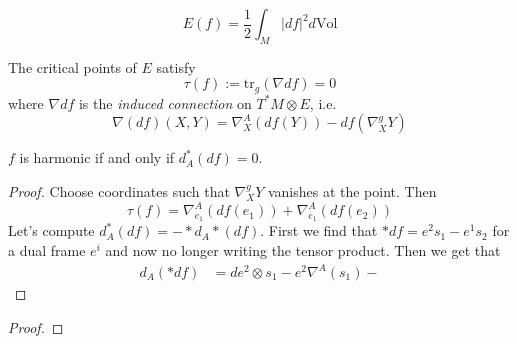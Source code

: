\begin{definition}
\label{definition-energy-functional}
$$
E(f)=\frac{1}{2}\int_M|df|^2d\text{Vol}
$$
\end{definition}

\begin{lemma}
\label{lemma-critical-points-of-energy-functional}
The critical points of $E$ satisfy
$$
\tau(f):=\text{tr}_g(\nabla df)=0
$$
where $\nabla df$ is the {\it induced connection} on $T^*M\otimes E$, i.e.
$$
\nabla(df)(X,Y)=\nabla_X^A(df(Y))-df(\nabla_X^gY)
$$
\end{lemma}

\begin{lemma}
\label{lemma-harmonic}
$f$ is harmonic if and only if $d_A^*(df)=0$.
\end{lemma}

\begin{proof}
Choose coordinates such that $\nabla^g_XY$ vanishes at the point. Then
$$
\tau(f)=\nabla^A_{e_1}(df(e_1))+\nabla^A_{e_1}(df(e_2))
$$
Let's compute $d_A^*(df)=-*d_A*(df)$. First we find that $*df=e^2s_1-e^1s_2$ for
a dual frame $e^i$ and now no longer writing the tensor product. Then we get
that 
\begin{align*}
d_A(*df)&=de^2\otimes s_1-e^2\nabla^A(s_1)-
\end{align*}

\end{proof}
\begin{proof}

\end{proof}







